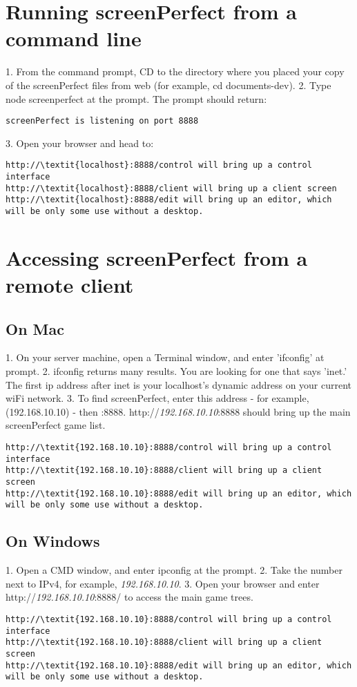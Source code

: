 \section{Running screenPerfect from a command line}
1. From the command prompt, CD to the directory where you placed your copy of the screenPerfect files from web (for example, cd documents\nodejs\screenperfect-dev).
2. Type node screenperfect at the prompt.
The prompt should return:
\begin{lstlisting}
screenPerfect is listening on port 8888
\end{lstlisting}

3. Open your browser and head to:
\begin{lstlisting}
http://\textit{localhost}:8888/control will bring up a control interface
http://\textit{localhost}:8888/client will bring up a client screen
http://\textit{localhost}:8888/edit will bring up an editor, which will be only some use without a desktop.
\end{lstlisting}

\section{Accessing screenPerfect from a remote client}
\subsection{On Mac}
1. On your server machine, open a Terminal window, and enter 'ifconfig' at prompt.
2. ifconfig returns many results. You are looking for one that says 'inet.' The first ip address after inet is your localhost's dynamic address on your current wiFi network. 
3. To find screenPerfect, enter this address - for example, (192.168.10.10) - then :8888. http://\textit{192.168.10.10}:8888 should bring up the main screenPerfect game list. 

\begin{lstlisting}
http://\textit{192.168.10.10}:8888/control will bring up a control interface
http://\textit{192.168.10.10}:8888/client will bring up a client screen
http://\textit{192.168.10.10}:8888/edit will bring up an editor, which will be only some use without a desktop.
\end{lstlisting}

\subsection{On Windows}
1. Open a CMD window, and enter ipconfig at the prompt.
2. Take the number next to IPv4, for example, \textit{192.168.10.10}.
3. Open your browser and enter http://\textit{192.168.10.10}:8888/ to access the main game trees.

\begin{lstlisting}
http://\textit{192.168.10.10}:8888/control will bring up a control interface
http://\textit{192.168.10.10}:8888/client will bring up a client screen
http://\textit{192.168.10.10}:8888/edit will bring up an editor, which will be only some use without a desktop.
\end{lstlisting}
